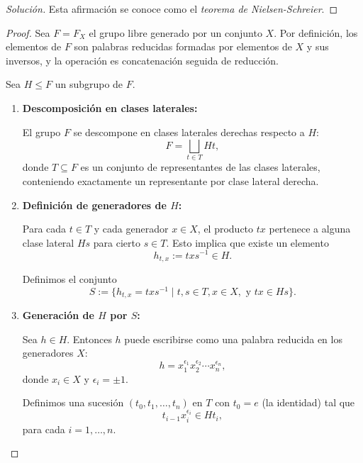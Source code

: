 \begin{ejercicio}
\end{ejercicio}

\begin{proof}[Solución]
Esta afirmación se conoce como el \emph{teorema de Nielsen-Schreier}. 
\end{proof}

\begin{teorema}
\end{teorema}
\begin{proof}
	Sea \( F = F_X \) el grupo libre generado por un conjunto \( X \). Por definición, los elementos de \( F \) son palabras reducidas formadas por elementos de \( X \) y sus inversos, y la operación es concatenación seguida de reducción.
	
	Sea \( H \leq F \) un subgrupo de \( F \).
	
	\begin{enumerate}
		\item \textbf{Descomposición en clases laterales:}
		
		El grupo \( F \) se descompone en clases laterales derechas respecto a \( H \):
		\[
		F = \bigsqcup_{t \in T} H t,
		\]
		donde \( T \subseteq F \) es un conjunto de representantes de las clases laterales, conteniendo exactamente un representante por clase lateral derecha.
		
		\item \textbf{Definición de generadores de \( H \):}
		
		Para cada \( t \in T \) y cada generador \( x \in X \), el producto \( t x \) pertenece a alguna clase lateral \( H s \) para cierto \( s \in T \). Esto implica que existe un elemento
		\[
		h_{t,x} := t x s^{-1} \in H.
		\]
		
		Definimos el conjunto
		\[
		S := \{ h_{t,x} = t x s^{-1} \mid t, s \in T, x \in X, \text{ y } t x \in H s \}.
		\]
		
		\item \textbf{Generación de \( H \) por \( S \):}
		
		Sea \( h \in H \). Entonces \( h \) puede escribirse como una palabra reducida en los generadores \( X \):
		\[
		h = x_1^{\epsilon_1} x_2^{\epsilon_2} \cdots x_n^{\epsilon_n},
		\]
		donde \( x_i \in X \) y \( \epsilon_i = \pm 1 \).
		
		Definimos una sucesión \( (t_0, t_1, \ldots, t_n) \) en \( T \) con \( t_0 = e \) (la identidad) tal que
		\[
		t_{i-1} x_i^{\epsilon_i} \in H t_i,
		\]
		para cada \( i = 1, \ldots, n \).
		

\end{enumerate}
\end{proof}
